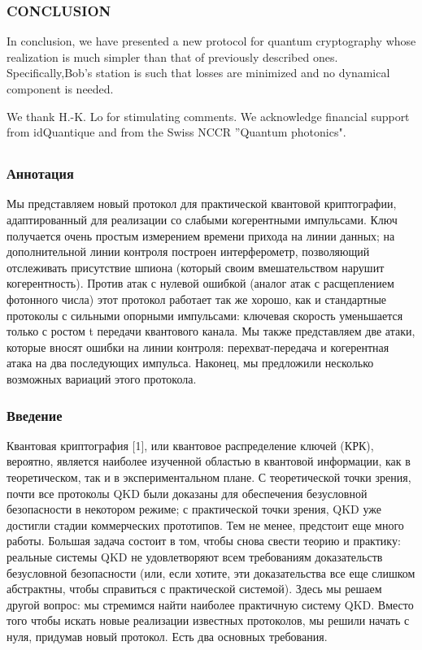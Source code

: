\subsubsection{CONCLUSION}

In conclusion, we have presented a new protocol for quantum cryptography whose realization is much simpler than that of previously described ones. Specifically,Bob’s station is such that losses are minimized and no dynamical component is needed.

We thank H.-K. Lo for stimulating comments. We acknowledge financial support from idQuantique and from the Swiss NCCR ”Quantum photonics".

\subsection{\trnas}

\subsubsection*{Аннотация}

Мы представляем новый протокол для практической квантовой криптографии, адаптированный для реализации со слабыми когерентными импульсами. Ключ получается очень простым измерением времени прихода на линии данных; на дополнительной линии контроля построен интерферометр, позволяющий отслеживать присутствие шпиона (который своим вмешательством нарушит когерентность). Против атак с нулевой ошибкой (аналог атак с расщеплением фотонного числа) этот протокол работает так же хорошо, как и стандартные протоколы с сильными опорными импульсами: ключевая скорость уменьшается только с ростом t передачи квантового канала. Мы также представляем две атаки, которые вносят ошибки на линии контроля: перехват-передача и когерентная атака на два последующих импульса. Наконец, мы предложили несколько возможных вариаций этого протокола.

\subsubsection{Введение}

Квантовая криптография [1], или квантовое распределение ключей (КРК), вероятно, является наиболее изученной областью в квантовой информации, как в теоретическом, так и в экспериментальном плане. С теоретической точки зрения, почти все протоколы QKD были доказаны для обеспечения безусловной безопасности в некотором режиме; с практической точки зрения, QKD уже достигли стадии коммерческих прототипов. Тем не менее, предстоит еще много работы. Большая задача состоит в том, чтобы снова свести теорию и практику: реальные системы QKD не удовлетворяют всем требованиям доказательств безусловной безопасности (или, если хотите, эти доказательства все еще слишком абстрактны, чтобы справиться с практической системой). Здесь мы решаем другой вопрос: мы стремимся найти наиболее практичную систему QKD. Вместо того чтобы искать новые реализации известных протоколов, мы решили начать с нуля, придумав новый протокол. Есть два основных требования.

